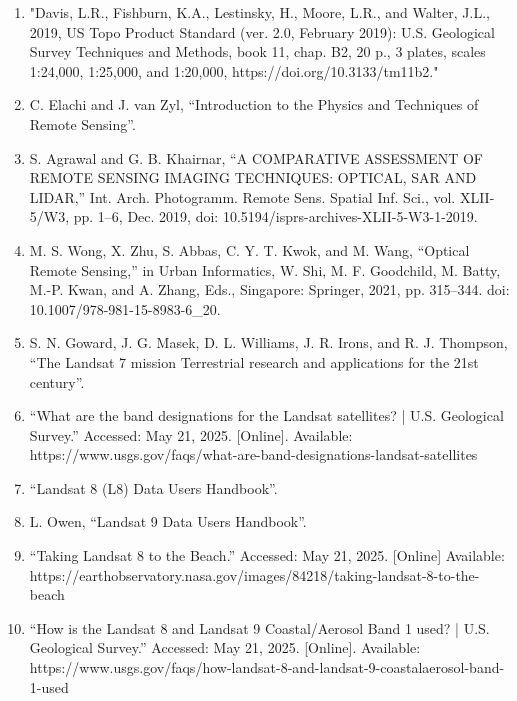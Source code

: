 \documentclass{article}
\begin{document}
\begin{enumerate}
    \item{"Davis, L.R., Fishburn, K.A., Lestinsky, H., Moore, L.R., and Walter, J.L., 2019, US Topo Product Standard (ver. 2.0, February 2019): U.S. Geological Survey Techniques and Methods, book 11, chap. B2, 20 p., 3 plates, scales 1:24,000, 1:25,000, and 1:20,000, https://doi.org/10.3133/tm11b2."}

    \item{C. Elachi and J. van Zyl, “Introduction to the Physics and Techniques of Remote Sensing”.}

    \item{S. Agrawal and G. B. Khairnar, “A COMPARATIVE ASSESSMENT OF REMOTE SENSING IMAGING TECHNIQUES: OPTICAL, SAR AND LIDAR,” Int. Arch. Photogramm. Remote Sens. Spatial Inf. Sci., vol. XLII-5/W3, pp. 1–6, Dec. 2019, doi: 10.5194/isprs-archives-XLII-5-W3-1-2019.}

    \item{M. S. Wong, X. Zhu, S. Abbas, C. Y. T. Kwok, and M. Wang, “Optical Remote Sensing,” in Urban Informatics, W. Shi, M. F. Goodchild, M. Batty, M.-P. Kwan, and A. Zhang, Eds., Singapore: Springer, 2021, pp. 315–344. doi: 10.1007/978-981-15-8983-6_20.}

    \item{S. N. Goward, J. G. Masek, D. L. Williams, J. R. Irons, and R. J. Thompson, “The Landsat 7 mission Terrestrial research and applications for the 21st century”.}

    \item{“What are the band designations for the Landsat satellites? | U.S. Geological Survey.” Accessed: May 21, 2025. [Online]. Available: https://www.usgs.gov/faqs/what-are-band-designations-landsat-satellites}

    \item{“Landsat 8 (L8) Data Users Handbook”.}

    \item{L. Owen, “Landsat 9 Data Users Handbook”.}

    \item{“Taking Landsat 8 to the Beach.” Accessed: May 21, 2025. [Online] Available: https://earthobservatory.nasa.gov/images/84218/taking-landsat-8-to-the-beach}


    \item{“How is the Landsat 8 and Landsat 9 Coastal/Aerosol Band 1 used? | U.S. Geological Survey.” Accessed: May 21, 2025. [Online]. Available: https://www.usgs.gov/faqs/how-landsat-8-and-landsat-9-coastalaerosol-band-1-used}


\end{enumerate}
\end{document}
